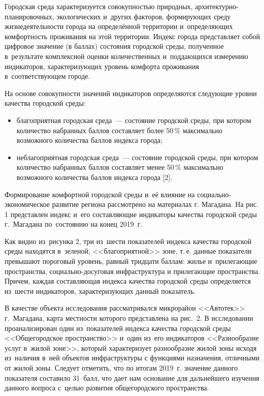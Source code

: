 Городская среда характеризуется совокупностью природных, ар\-хи\-тек\-тур\-но-пла\-ни\-ро\-воч\-ных, экологических и~других факторов, формирующих среду жизнедеятельности города на определённой территории и~определяющих комфортность проживания на этой территории. Индекс города представляет собой цифровое значение (в баллах) состояния городской среды, полученное в~результате комплексной оценки количественных и~поддающихся измерению индикаторов, характеризующих уровень комфорта проживания в~соответствующем городе.

На основе совокупности значений индикаторов определяются следующие уровни качества городской среды:
\begin{itemize}[noitemsep]\vspace{-8pt}
  \item благоприятная городская среда~--- состояние городской среды, при котором количество набранных баллов составляет более 50\,\% максимально возможного количества баллов индекса города;
  \item неблагоприятная городская среда~--- состояние городской среды, при котором количество набранных баллов составляет менее 50\,\% максимально возможного количества баллов индекса города [2].
\end{itemize}
 \vspace{-8pt}\enlargethispage{\baselineskip}
Формирование комфортной городской среды и~её влияние на социально-экономическое развитие региона рассмотрено на материалах г. Магадана. На рис. 1 представлен индекс и~его составляющие индикаторы качества городской среды г.~Магадана по~состоянию на конец 2019~г.



Как видно из~рисунка 2, три из~шести показателей индекса качества
городской среды находятся в~зеленой, <<благоприятной>> зоне, т.\,е. данные показатели превышают пороговый уровень, равный тридцати баллам: жилье и~прилегающие пространства, социально-досуговая инфраструктура и
прилегающие пространства. Причем, каждая составляющая индекса качества
городской среды определяется из~шести индикаторов, характеризующих
данный показатель.

В качестве объекта исследования рассматривался микрорайон <<Автотек>> г.~Магадана, карта местности которого представлена на рис.~2. В исследовании проанализирован один из~показателей индекса
качества городской среды <<Общегородское пространство>> и~один из~его
индикаторов <<Разнообразие услуг в~жилой зоне>>, который характеризует
разнообразие жилой зоны исходя из~наличия в~ней объектов инфраструктуры
с функциями назначения, отличными от жилой зоны. Следует отметить, что
по итогам 2019~г. значение данного показателя составило 31~балл, что
дает нам основание для дальнейшего изучения данного вопроса с~целью
развития общегородского пространства.


